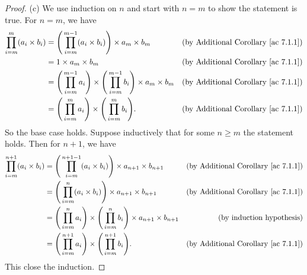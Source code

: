 \begin{proof}{(c)}
We use induction on \(n\) and start with \(n = m\) to show the statement is true.
For \(n = m\), we have
\begin{align*}
\prod_{i = m}^m (a_i \times b_i) &= \Bigg(\prod_{i = m}^{m - 1} (a_i \times b_i)\Bigg) \times a_m \times b_m & \text{(by Additional Corollary \ref{ac 7.1.1})} \\
&= 1 \times a_m \times b_m & \text{(by Additional Corollary \ref{ac 7.1.1})} \\
&= \Bigg(\prod_{i = m}^{m - 1} a_i\Bigg) \times \Bigg(\prod_{i = m}^{m - 1} b_i\Bigg) \times a_m \times b_m & \text{(by Additional Corollary \ref{ac 7.1.1})} \\
&= \Bigg(\prod_{i = m}^m a_i\Bigg) \times \Bigg(\prod_{i = m}^m b_i\Bigg). & \text{(by Additional Corollary \ref{ac 7.1.1})}
\end{align*}
So the base case holds.
Suppose inductively that for some \(n \geq m\) the statement holds.
Then for \(n + 1\), we have
\begin{align*}
\prod_{i = m}^{n + 1} (a_i \times b_i) &= \Bigg(\prod_{i = m}^{n + 1 - 1} (a_i \times b_i)\Bigg) \times a_{n + 1} \times b_{n + 1} & \text{(by Additional Corollary \ref{ac 7.1.1})} \\
&= \Bigg(\prod_{i = m}^n (a_i \times b_i)\Bigg) \times a_{n + 1} \times b_{n + 1} & \text{(by Additional Corollary \ref{ac 7.1.1})} \\
&= \Bigg(\prod_{i = m}^n a_i\Bigg) \times \Bigg(\prod_{i = m}^n b_i\Bigg) \times a_{n + 1} \times b_{n + 1} & \text{(by induction hypothesis)} \\
&= \Bigg(\prod_{i = m}^{n + 1} a_i\Bigg) \times \Bigg(\prod_{i = m}^{n + 1} b_i\Bigg). & \text{(by Additional Corollary \ref{ac 7.1.1})}
\end{align*}
This close the induction.
\end{proof}

